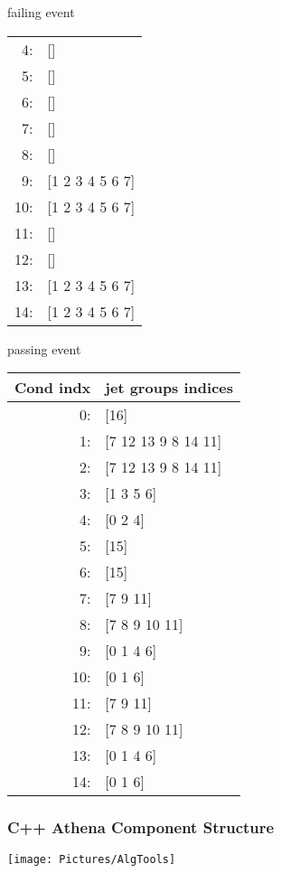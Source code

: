 \documentclass{beamer}
\begin{document}
\begin{frame}[fragile=singleslide]
\begin{minipage}[t]{0.48\linewidth}
\begin{block}{failing event}
\begin{center}
\begin{tiny}
\begin{tabular}{r|l}
4: & [] \\
5: & [] \\
6: & [] \\
7: & [] \\
8: & [] \\
9: & [1 2 3 4 5 6 7] \\
10:& [1 2 3 4 5 6 7] \\
11:& [] \\
12:& [] \\
13:& [1 2 3 4 5 6 7] \\
14:& [1 2 3 4 5 6 7] \\
\end{tabular}
\end{tiny}
\end{center}
\end{block}
\end{minipage}
\begin{minipage}[t]{0.48\linewidth}
\begin{block}{passing event}
\begin{center}
\begin{tiny}
\begin{tabular}{r|l}
Cond indx& jet groups indices\\ \hline
0: & [16] \\
1: & [7 12 13 9 8 14 11] \\
2: & [7 12 13 9 8 14 11] \\
3: & [1 3 5 6] \\
4: & [0 2 4] \\
5: & [15] \\
6: & [15] \\
7: & [7 9 11] \\
8: & [7 8 9 10 11] \\
9: & [0 1 4 6] \\
10: & [0 1 6] \\
11: & [7 9 11] \\
12: & [7 8 9 10 11] \\
13: & [0 1 4 6] \\
14: & [0 1 6] \\
\end{tabular}
\end{tiny}
\end{center}
\end{block}
\end{minipage}\hfill
\end{frame}

%
%
 \frame
{
\frametitle{C++ Athena Component Structure}
\texttt{[image: Pictures/AlgTools]}


}
\end{document}
